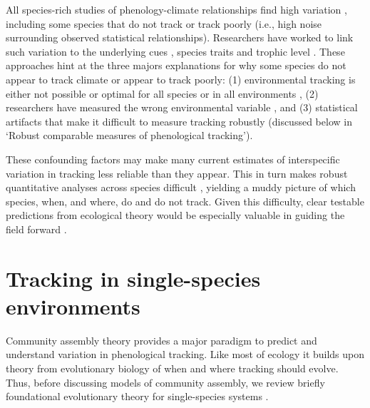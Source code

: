 \documentclass[11pt,letterpaper]{article}
\begin{document}
All species-rich studies of phenology-climate relationships find high variation \citep{Cook:2012pnas,thackeray2016}, including some species that do not track or track poorly (i.e., high noise surrounding observed statistical relationships). Researchers have worked to link such variation to the underlying cues \citep[e.g.,][]{Cook:2012pnas}, species traits \citep[e.g.,][]{cohen2018} and trophic level \citep[e.g.,][]{thackeray2016}. These approaches hint at the three majors explanations for why some species do not appear to track climate or appear to track poorly: (1) environmental tracking is either not possible or optimal for all species or in all environments \citep[discussed below in `Tracking in single-species environments' and see][]{simons2011}, (2) researchers have measured the wrong environmental variable \citep[i.e., a variable species do not track,][]{chmura2019}, and (3) statistical artifacts that make it difficult to measure tracking robustly (discussed below in `Robust comparable measures of phenological tracking'). 

These confounding factors may make many current estimates of interspecific variation in tracking less reliable than they appear. This in turn makes robust quantitative analyses across species difficult \citep{brown2016,kharouba2018}, yielding a muddy picture of which species, when, and where, do and do not track. Given this difficulty, clear testable predictions from ecological theory would be especially valuable in guiding the field forward \citep{Smaldino2016}.  

\section{Tracking in single-species environments}
Community assembly theory provides a major paradigm to predict and understand variation in phenological tracking. Like most of ecology it builds upon theory from evolutionary biology of when and where tracking should evolve. Thus, before discussing models of community assembly, we review briefly foundational evolutionary theory for single-species systems \citep[where most work has focused, but see][]{Mathias2002,Childs2010,Johansson2015}.
\end{document}
